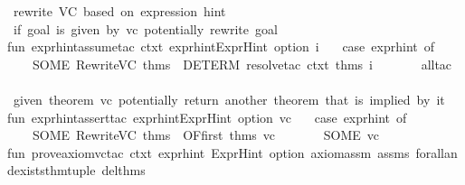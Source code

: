 \begin{isabellebody}
\isanewline
{\isacharparenleft}{\kern0pt}{\isacharasterisk}{\kern0pt}\ rewrite\ VC\ based\ on\ expression\ hint\ {\isacharasterisk}{\kern0pt}{\isacharparenright}{\kern0pt}\isanewline
\isanewline
{\isacharparenleft}{\kern0pt}{\isacharasterisk}{\kern0pt}\ if\ goal\ is\ given\ by\ vc{\isacharcomma}{\kern0pt}\ potentially\ rewrite\ goal\ {\isacharasterisk}{\kern0pt}{\isacharparenright}{\kern0pt}\isanewline
fun\ expr{\isacharunderscore}{\kern0pt}hint{\isacharunderscore}{\kern0pt}assume{\isacharunderscore}{\kern0pt}tac\ ctxt\ {\isacharparenleft}{\kern0pt}expr{\isacharunderscore}{\kern0pt}hint{\isacharcolon}{\kern0pt}ExprHint\ option{\isacharparenright}{\kern0pt}\ i\ {\isacharequal}{\kern0pt}\isanewline
\ \ {\isacharparenleft}{\kern0pt}case\ expr{\isacharunderscore}{\kern0pt}hint\ of\isanewline
\ \ \ \ {\isacharparenleft}{\kern0pt}SOME\ {\isacharparenleft}{\kern0pt}RewriteVC\ thms{\isacharparenright}{\kern0pt}{\isacharparenright}{\kern0pt}\ {\isacharequal}{\kern0pt}{\isachargreater}{\kern0pt}\ DETERM\ {\isacharparenleft}{\kern0pt}resolve{\isacharunderscore}{\kern0pt}tac\ ctxt\ thms\ i{\isacharparenright}{\kern0pt}\isanewline
\ \ \ \ {\isacharbar}{\kern0pt}\ {\isacharunderscore}{\kern0pt}\ {\isacharequal}{\kern0pt}{\isachargreater}{\kern0pt}\ all{\isacharunderscore}{\kern0pt}tac\isanewline
\ \ {\isacharparenright}{\kern0pt}{\isacharsemicolon}{\kern0pt}\isanewline
\isanewline
{\isacharparenleft}{\kern0pt}{\isacharasterisk}{\kern0pt}\ given\ theorem\ vc{\isacharcomma}{\kern0pt}\ potentially\ return\ another\ theorem\ that\ is\ implied\ by\ it\ {\isacharasterisk}{\kern0pt}{\isacharparenright}{\kern0pt}\isanewline
fun\ expr{\isacharunderscore}{\kern0pt}hint{\isacharunderscore}{\kern0pt}assert{\isacharunderscore}{\kern0pt}tac\ {\isacharparenleft}{\kern0pt}expr{\isacharunderscore}{\kern0pt}hint{\isacharcolon}{\kern0pt}ExprHint\ option{\isacharparenright}{\kern0pt}\ vc\ {\isacharequal}{\kern0pt}\isanewline
\ \ {\isacharparenleft}{\kern0pt}case\ expr{\isacharunderscore}{\kern0pt}hint\ of\isanewline
\ \ \ \ {\isacharparenleft}{\kern0pt}SOME\ {\isacharparenleft}{\kern0pt}RewriteVC\ thms{\isacharparenright}{\kern0pt}{\isacharparenright}{\kern0pt}\ {\isacharequal}{\kern0pt}{\isachargreater}{\kern0pt}\ OF{\isacharunderscore}{\kern0pt}first\ thms\ vc\isanewline
\ \ \ \ {\isacharbar}{\kern0pt}\ {\isacharunderscore}{\kern0pt}\ {\isacharequal}{\kern0pt}{\isachargreater}{\kern0pt}\ SOME\ {\isacharparenleft}{\kern0pt}vc{\isacharparenright}{\kern0pt}\isanewline
\ \ {\isacharparenright}{\kern0pt}{\isacharsemicolon}{\kern0pt}\isanewline
\isanewline
\isanewline
fun\ prove{\isacharunderscore}{\kern0pt}axiom{\isacharunderscore}{\kern0pt}vc{\isacharunderscore}{\kern0pt}tac\ ctxt\ {\isacharparenleft}{\kern0pt}expr{\isacharunderscore}{\kern0pt}hint{\isacharcolon}{\kern0pt}\ ExprHint\ option{\isacharparenright}{\kern0pt}\ axiom{\isacharunderscore}{\kern0pt}assm\ assms\ forall{\isacharunderscore}{\kern0pt}and{\isacharunderscore}{\kern0pt}exists{\isacharunderscore}{\kern0pt}thm{\isacharunderscore}{\kern0pt}tuple\ del{\isacharunderscore}{\kern0pt}thms\ {\isacharequal}{\kern0pt}\isanewline

\end{isabellebody}
